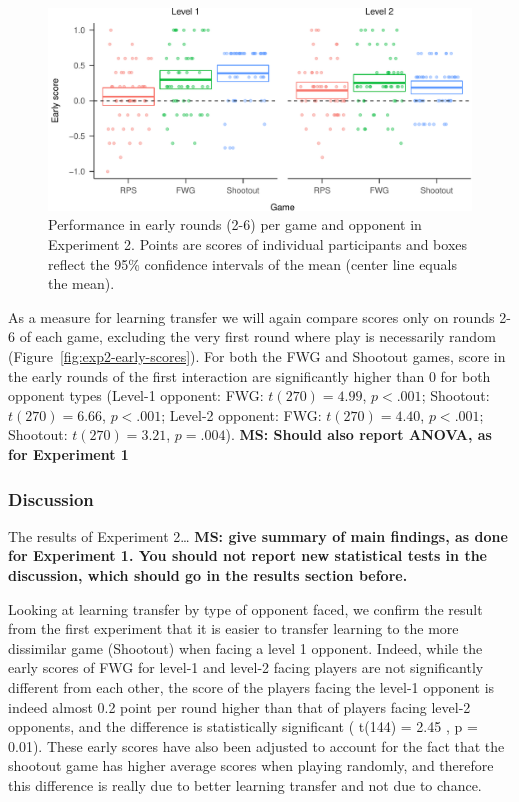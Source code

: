 \documentclass[
  english,
  man,floatsintext]{apa6}
\begin{document}
\begin{figure}

{\centering \includegraphics{paper_draft_2021_files/figure-latex/exp2-early-score-by-opp-1} 

}

\caption{\label{ref:figure4-caption}Performance in early rounds (2-6) per game and opponent in Experiment 2. Points are scores of individual participants and boxes reflect the 95\% confidence intervals of the mean (center line equals the mean).}\label{fig:exp2-early-score-by-opp}
\end{figure}

As a measure for learning transfer we will again compare scores only on rounds 2-6 of each game, excluding the very first round where play is necessarily random (Figure~\ref{fig:exp2-early-scores}). For both the FWG and Shootout games, score in the early rounds of the first interaction are significantly higher than 0 for both opponent types (Level-1 opponent: FWG: \(t(270) = 4.99\), \(p < .001\); Shootout: \(t(270) = 6.66\), \(p < .001\); Level-2 opponent: FWG: \(t(270) = 4.40\), \(p < .001\); Shootout: \(t(270) = 3.21\), \(p=.004\)). \textbf{MS: Should also report ANOVA, as for Experiment 1}

\hypertarget{discussion-1}{%
\subsubsection{Discussion}\label{discussion-1}}

The results of Experiment 2\ldots{} \textbf{MS: give summary of main findings, as done for Experiment 1. You should not report new statistical tests in the discussion, which should go in the results section before.}

Looking at learning transfer by type of opponent faced, we confirm the result from the first experiment that it is easier to transfer learning to the more dissimilar game (Shootout) when facing a level 1 opponent. Indeed, while the early scores of FWG for level-1 and level-2 facing players are not significantly different from each other, the score of the players facing the level-1 opponent is indeed almost 0.2 point per round higher than that of players facing level-2 opponents, and the difference is statistically significant ( t(144) = 2.45 , p = 0.01). These early scores have also been adjusted to account for the fact that the shootout game has higher average scores when playing randomly, and therefore this difference is really due to better learning transfer and not due to chance.
\end{document}
